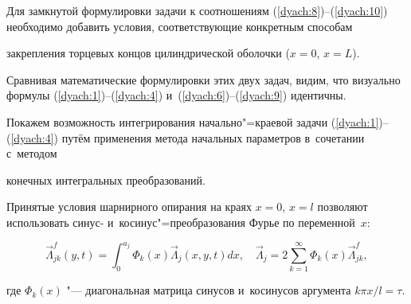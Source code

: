 








Для замкнутой формулировки задачи к соотношениям (\ref{dyach:8})--(\ref{dyach:10}) необходимо добавить условия, соответствующие конкретным способам

закрепления торцевых концов цилиндрической оболочки ($x=0$, $x= L$).



\smallskip




Сравнивая математические формулировки этих двух задач, видим, что визуально формулы (\ref{dyach:1})--(\ref{dyach:4}) и~(\ref{dyach:6})--(\ref{dyach:9}) идентичны.

Покажем возможность интегрирования начально"=краевой задачи (\ref{dyach:1})--(\ref{dyach:4}) путём применения метода начальных параметров в~сочетании с~методом

конечных интегральных преобразований.



Принятые условия шарнирного опирания на краях $x=0$, $x=l$ позволяют использовать синус- и~косинус"=преобразования Фурье по переменной~$x$:

\begin{equation}

\label{dyach:10}

\vec{\Lambda}^f_{jk}(y,t) = \int_{0}^{a_j} \Phi_k(x)\vec{\Lambda}_j(x,y,t) dx, \quad \vec{\Lambda}_j = 2\sum\limits_{k=1}^\infty \Phi_k(x)\vec{\Lambda}^f_{jk},

\end{equation}

где $\Phi_k(x)$ "--- диагональная матрица синусов и~косинусов аргумента \mbox{$k\pi x/l=\tau$.}


